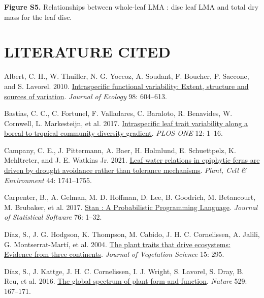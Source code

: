 \documentclass[
  12pt,
  a4paper,
,tablecaptionabove
]{scrartcl}
\newlength{\cslhangindent}
\newenvironment{CSLReferences}[2] %
 {%
  \setlength{\parindent}{0pt}
  \ifodd #1 \everypar{\setlength{\hangindent}{\cslhangindent}}\ignorespaces\fi
  \ifnum #2 > 0
  \setlength{\parskip}{#2\baselineskip}
  \fi
 }%
 {}
\begin{document}
\textbf{Figure S5.}
Relationships between whole-leaf LMA : disc leaf LMA and total dry mass for the leaf disc.

\hypertarget{literature-cited}{%
\section{LITERATURE CITED}\label{literature-cited}}

\hypertarget{refs}{}
\begin{CSLReferences}{1}{0}
\leavevmode{}%
Albert, C. H., W. Thuiller, N. G. Yoccoz, A. Soudant, F. Boucher, P. Saccone, and S. Lavorel. 2010. \href{https://doi.org/10.1111/j.1365-2745.2010.01651.x}{Intraspecific functional variability: {Extent}, structure and sources of variation}. \emph{Journal of Ecology} 98: 604--613.

\leavevmode{}%
Bastias, C. C., C. Fortunel, F. Valladares, C. Baraloto, R. Benavides, W. Cornwell, L. Markesteijn, et al. 2017. \href{https://doi.org/10.1371/journal.pone.0172495}{Intraspecific leaf trait variability along a boreal-to-tropical community diversity gradient}. \emph{PLOS ONE} 12: 1--16.

\leavevmode{}%
Campany, C. E., J. Pittermann, A. Baer, H. Holmlund, E. Schuettpelz, K. Mehltreter, and J. E. Watkins Jr. 2021. \href{https://doi.org/10.1111/pce.14042}{Leaf water relations in epiphytic ferns are driven by drought avoidance rather than tolerance mechanisms}. \emph{Plant, Cell \& Environment} 44: 1741--1755.

\leavevmode{}%
Carpenter, B., A. Gelman, M. D. Hoffman, D. Lee, B. Goodrich, M. Betancourt, M. Brubaker, et al. 2017. \href{https://doi.org/10.18637/jss.v076.i01}{Stan : {A Probabilistic Programming Language}}. \emph{Journal of Statistical Software} 76: 1--32.

\leavevmode{}%
Díaz, S., J. G. Hodgson, K. Thompson, M. Cabido, J. H. C. Cornelissen, A. Jalili, G. Montserrat-Martí, et al. 2004. \href{https://doi.org/10.1658/1100-9233(2004)015\%5B0295:TPTTDE\%5D2.0.CO;2}{The plant traits that drive ecosystems: {Evidence} from three continents}. \emph{Journal of Vegetation Science} 15: 295.

\leavevmode{}%
Díaz, S., J. Kattge, J. H. C. Cornelissen, I. J. Wright, S. Lavorel, S. Dray, B. Reu, et al. 2016. \href{https://doi.org/10.1038/nature16489}{The global spectrum of plant form and function}. \emph{Nature} 529: 167--171.


\end{CSLReferences}
\end{document}
